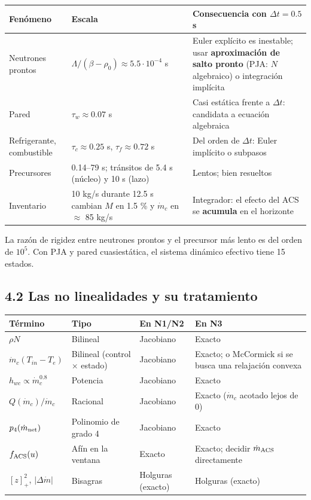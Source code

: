 \documentclass[11pt,a4paper]{article}
\begin{document}
{\small
\begin{xltabular}{\linewidth}{@{}YYY@{}}
\toprule
\textbf{Fenómeno} & \textbf{Escala} & \textbf{Consecuencia con $\Delta t=0.5$ s} \\
\midrule
\endhead
Neutrones prontos & $\Lambda/(\beta-\rho_0)\approx5.5\cdot10^{-4}$ s & Euler explícito es inestable; usar \textbf{aproximación de salto pronto} (PJA: $N$ algebraico) o integración implícita \\
Pared & $\tau_w\approx0.07$ s & Casi estática frente a $\Delta t$: candidata a ecuación algebraica \\
Refrigerante, combustible & $\tau_c\approx0.25$ s, $\tau_f\approx0.72$ s & Del orden de $\Delta t$: Euler implícito o subpasos \\
Precursores & 0.14–79 s; tránsitos de 5.4 s (núcleo) y 10 s (lazo) & Lentos; bien resueltos \\
Inventario & 10 kg/s durante 12.5 s cambian $M$ en 1.5 \% y $\dot m_c$ en $\approx$ 85 kg/s & Integrador: el efecto del ACS se \textbf{acumula} en el horizonte \\
\bottomrule
\end{xltabular}}

La razón de rigidez entre neutrones prontos y el precursor más lento es del orden de $10^5$. Con PJA y pared cuasiestática, el sistema dinámico efectivo tiene 15 estados.

\subsection*{4.2 Las no linealidades y su tratamiento}
{\footnotesize
\begin{xltabular}{\linewidth}{@{}YYYY@{}}
\toprule
\textbf{Término} & \textbf{Tipo} & \textbf{En N1/N2} & \textbf{En N3} \\
\midrule
\endhead
$\rho N$ & Bilineal & Jacobiano & Exacto \\
$\dot m_c(T_{in}-T_e)$ & Bilineal (control $\times$ estado) & Jacobiano & Exacto; o McCormick si se busca una relajación convexa \\
$h_{wc}\propto\dot m_c^{0.8}$ & Potencia & Jacobiano & Exacto \\
$Q(\dot m_c)/\dot m_c$ & Racional & Jacobiano & Exacto ($\dot m_c$ acotado lejos de 0) \\
$p_4(\dot m_{\rm net})$ & Polinomio de grado 4 & Jacobiano & Exacto \\
$f_{\rm ACS}(u)$ & Afín en la ventana & Exacto & Exacto; decidir $\dot m_{\rm ACS}$ directamente \\
$[z]_+^2$, $\lvert\Delta\dot m\rvert$ & Bisagras & Holguras (exacto) & Holguras (exacto) \\
\bottomrule
\end{xltabular}}
\end{document}
